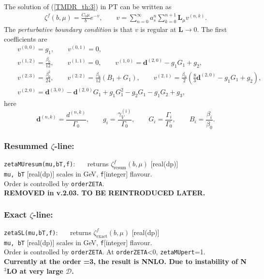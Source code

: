 \documentclass[prd,nofootinbib,eqsecnum,final]{revtex4}
\renewcommand{\(}{\left(}
\renewcommand{\)}{\right)}
\renewcommand{\[}{\left[}
\renewcommand{\]}{\right]}
\newcommand{\red}[1]{{\color[rgb]{1,0,0} #1}}
\begin{document}
The solution of (\ref{TMDR_th:3}) in PT can be written as
\begin{eqnarray}
\zeta^f(b,\mu)=\frac{C_0 \mu}{b}e^{-v},\qquad v=\sum_{n=0}^\infty a_s^n \sum_{k=0}^{n+1}\mathbf{L}_\mu v^{(n,k)}.
\end{eqnarray}
The \textit{perturbative boundary condition} is that $v$ is regular at $\mathbf{L}\to0$. The first coefficients are 
\begin{eqnarray*}
&& v^{(0,0)}=g_1,\qquad v^{(0,1)}=0,
\\
&& v^{(1,2)}=\frac{\beta_0}{12},\qquad v^{(1,1)}=0,\qquad v^{(1,0)}=\mathbf{d}^{(2,0)}-g_1G_1+g_2,
\\
&& v^{(2,3)}=\frac{\beta_0^2}{24},\qquad v^{(2,2)}=\frac{\beta_0}{12}\(B_1+G_1\),\qquad v^{(2,1)}=\frac{\beta_0}{2}\(\frac{8}{3}\mathbf{d}^{(2,0)}-g_1G_1+g_2\),
\\
&& v^{(2,0)}=\mathbf{d}^{(3,0)}-\mathbf{d}^{(2,0)}G_1+g_1G_1^2-g_2G_1-g_1G_2+g_3,
\end{eqnarray*}
here
$$
\mathbf{d}^{(n,k)}=\frac{d^{(n,k)}}{\Gamma_0},\qquad g_i=\frac{\gamma_V^{(i)}}{\Gamma_0},\qquad G_i=\frac{\Gamma_i}{\Gamma_0},\qquad B_i=\frac{\beta_i}{\beta_0}.
$$

\subsubsection{Resummed $\zeta$-line:}
\begin{tcolorbox}
\texttt{zetaMUresum(mu,bT,f)}: ~~~returns $\zeta_{\text{resum}}^f(b,\mu)$ [real(dp)]
\\
\texttt{mu, bT} [real(dp)] scales in GeV, \texttt{f}[integer] flavour. 
\\
Order is controlled by \texttt{orderZETA}.
\\
\textbf{\red{REMOVED in v.2.03. TO BE REINTRODUCED LATER.}}
\end{tcolorbox}

\subsubsection{Exact $\zeta$-line:}
\begin{tcolorbox}
\texttt{zetaSL(mu,bT,f)}: ~~~returns $\zeta_{\text{exact}}^f(b,\mu)$ [real(dp)]
\\
\texttt{mu, bT} [real(dp)] scales in GeV, \texttt{f}[integer] flavour. 
\\
Order is controlled by \texttt{orderZETA}. At \texttt{orderZETA}<0, \texttt{zetaMUpert}=1.
\\
\textbf{\red{Currently at the order =3, the result is NNLO. Due to instability of N$^3$LO at very large $\mathcal{D}$.}}
\end{tcolorbox}
\end{document}
